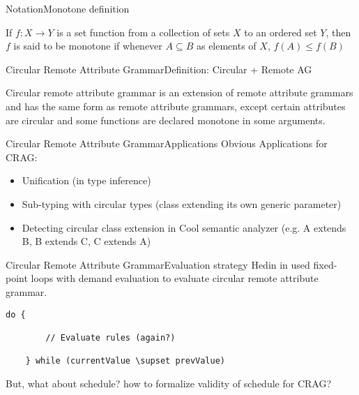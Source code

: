 \begin{frame}{Notation}{Monotone definition}

\begin{definition}
If $f:X \rightarrow Y$ is a \alert{set function} from a collection of sets $X$ to an ordered set $Y$, then $f$ is said to be monotone if whenever \alert{$A \subseteq B$} as elements of $X$, \alert{$f(A) \leq f(B)$}
\end{definition}

\end{frame}


\begin{frame}{Circular Remote Attribute Grammar}{Definition: Circular + Remote AG}

\begin{definition}
Circular remote attribute grammar is an \alert{extension of remote attribute grammars} and has the same form as remote attribute grammars, except \alert{certain attributes are circular} and \alert{some functions are declared monotone in some arguments}.
\end{definition}
\end{frame}



\begin{frame}{Circular Remote Attribute Grammar}{Applications}
Obvious Applications for CRAG:

\begin{itemize}
    \item Unification (in type inference)
	\item Sub-typing with circular types (class extending its own generic parameter)
	\item Detecting circular class extension in Cool semantic analyzer (e.g. A extends B, B extends C, C extends A)
\end{itemize}
\end{frame}



\begin{frame}[fragile=singleslide]{Circular Remote Attribute Grammar}{Evaluation strategy}
Hedin in \cite{10.1016/j.scico.2005.06.005} used fixed-point loops with \alert{demand evaluation} to evaluate circular remote attribute grammar.

\begin{Verbatim}[fontsize=\small]
    do {
    
        // Evaluate rules (again?)
        
    } while (currentValue \supset prevValue)
\end{Verbatim}

\newlinevspace

But, what about \alert{schedule}? how to formalize validity of schedule for CRAG?
\end{frame}


